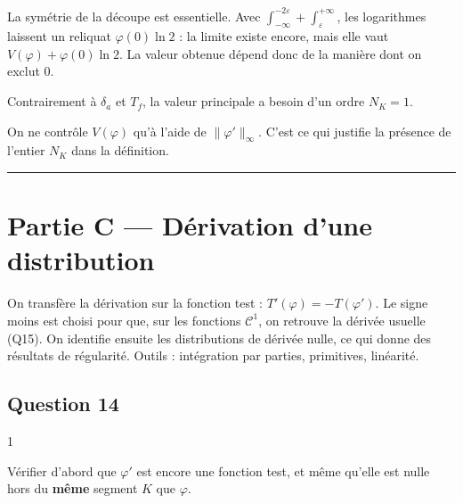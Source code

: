 \documentclass[11pt,a4paper]{article}
\begin{document}
\begin{piege}

La symétrie de la découpe est essentielle. Avec \(\int_{-\infty}^{-2\varepsilon}+\int_\varepsilon^{+\infty}\), les logarithmes laissent un reliquat \(\varphi(0)\ln2\) : la limite existe encore, mais elle vaut \(V(\varphi)+\varphi(0)\ln2\). La valeur obtenue dépend donc de la manière dont on exclut \(0\).

\end{piege}

\begin{methode}

Contrairement à \(\delta_a\) et \(T_f\), la valeur principale a besoin d'un ordre \(N_K=1\).

On ne contrôle \(V(\varphi)\) qu'à l'aide de \(\|\varphi'\|_\infty\). C'est ce qui justifie la présence de l'entier \(N_K\) dans la définition.

\end{methode}

\begin{center}\rule{0.5\linewidth}{0.5pt}\end{center}

\hypertarget{partie-c-duxe9rivation-dune-distribution}{%
\section{Partie C --- Dérivation d'une distribution}\label{partie-c-duxe9rivation-dune-distribution}}

On transfère la dérivation sur la fonction test : \(T'(\varphi)=-T(\varphi')\). Le signe moins est choisi pour que, sur les fonctions \(\mathcal C^1\), on retrouve la dérivée usuelle (Q15). On identifie ensuite les distributions de dérivée nulle, ce qui donne des résultats de régularité. Outils : intégration par parties, primitives, linéarité.

\hypertarget{question-14}{%
\subsection{Question 14}\label{question-14}}

\begin{indication}{1}

Vérifier d'abord que \(\varphi'\) est encore une fonction test, et même qu'elle est nulle hors du \textbf{même} segment \(K\) que \(\varphi\).

\end{indication}
\end{document}
